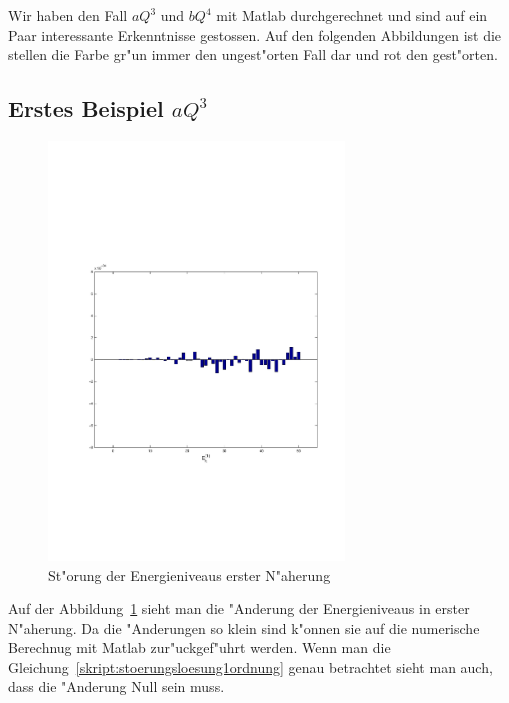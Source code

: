 \begin{refsection}
Wir haben den Fall $aQ^3$ und $bQ^4$ mit Matlab durchgerechnet und sind auf ein Paar interessante Erkenntnisse gestossen. Auf den folgenden Abbildungen ist die stellen die Farbe gr"un immer den ungest"orten Fall dar und rot den gest"orten.

\subsection{Erstes Beispiel $aQ^3$}

\begin{figure}[h]	%
\centering
\includegraphics[width=0.7\textwidth]{anharmonisch/images/x3/EK1.pdf}
\caption{St"orung der Energieniveaus erster N"aherung
\label{skript:x3_EK1}}
\end{figure}

Auf der Abbildung~\ref{skript:x3_EK1} sieht man die "Anderung der Energieniveaus in erster N"aherung. Da die "Anderungen so klein sind k"onnen sie auf die numerische Berechnug mit Matlab zur"uckgef"uhrt werden. Wenn man die Gleichung~\ref{skript:stoerungsloesung1ordnung} genau betrachtet sieht man auch, dass die "Anderung Null sein muss.


\end{refsection}
